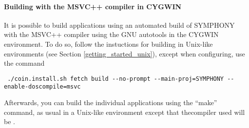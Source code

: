 \paragraph{Building with the MSVC++ compiler in CYGWIN}

It is possible to build applications using an automated build of SYMPHONY
with the MSVC++ compiler  using the GNU autotools in the CYGWIN
environment. To do so, follow the instuctions for building in Unix-like
environments (see Section \ref{getting_started_unix}), except when
configuring, use the command

{\color{Brown}
\begin{verbatim}
 ./coin.install.sh fetch build --no-prompt --main-proj=SYMPHONY --enable-doscompile=msvc
\end{verbatim}}

Afterwards, you can build the individual applications using the ``make''
command, as usual in a Unix-like environment except that thecompiler used will
be .
